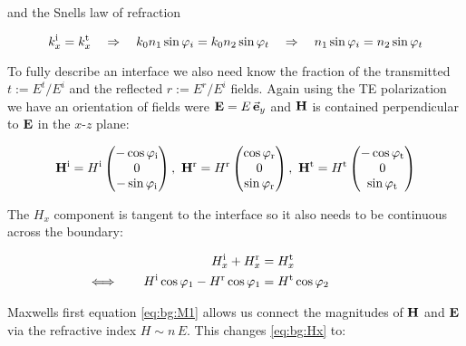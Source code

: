 and the Snells law of refraction

\begin{equation}
    k^{\mathrm{i}}_x = k^{\mathrm{t}}_x
    \quad \Rightarrow \quad
    k_0 n_1 \sin \varphi_i =  k_0 n_2 \sin \varphi_t
    \quad \Rightarrow \quad
    n_1 \sin \varphi_i = n_2 \sin \varphi_t
\end{equation}

To fully describe an interface we also need know the fraction of the transmitted
$t := E^t / E^i$
and the reflected
$r := E^r / E^i$ fields.
Again using the TE polarization we have an orientation of fields were $\vb E = E \, \va e_y$ and $\vb H$ is contained perpendicular to $\vb E$ in the $x$-$z$ plane:

\begin{equation} \label{eq:bg:H}
    \vb H^{\mathrm{i}} = H^{\mathrm{i}}
    \begin{pmatrix}
        -\cos \varphi_{\mathrm{i}}\\ 0\\ -\sin \varphi_{\mathrm{i}}
    \end{pmatrix}
    , \
    \vb H^{\mathrm{r}} = H^{\mathrm{r}}
    \begin{pmatrix}
        \cos \varphi_{\mathrm{r}} \\ 0\\ \sin \varphi_{\mathrm{r}}
    \end{pmatrix}
    , \
    \vb H^{\mathrm{t}} = H^{\mathrm{t}}
    \begin{pmatrix}
        -\cos \varphi_{\mathrm{t}}\\ 0\\ \sin \varphi_{\mathrm{t}}
    \end{pmatrix}
\end{equation}


The $H_x$ component is tangent to the interface so it also needs to be continuous across the boundary:

\begin{equation}\label{eq:bg:Hx}
\begin{aligned}
     H^{\mathrm{i}}_x +  H^{\mathrm{r}}_x &=  H^{\mathrm{t}}_x \\
    \Longleftrightarrow \qquad
    H^{\mathrm{i}} \cos \varphi_1 - H^{\mathrm{r}} \cos \varphi_1 &= H^{\mathrm{t}} \cos \varphi_2
    \qquad  \qquad
\end{aligned}
\end{equation}

Maxwells first equation \eqref{eq:bg:M1} allows us connect the magnitudes of $\vb H$ and $\vb E$ via the refractive index $H \sim n \, E$. This changes \eqref{eq:bg:Hx} to:

